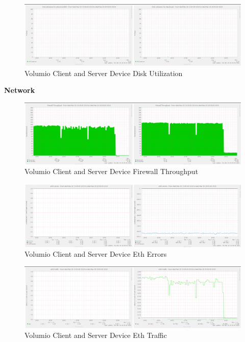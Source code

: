 \documentclass[11pt,a4paper,headinclude=false,footinclude=false]{scrreprt}
\begin{document}
\begin{figure}[H]
\includegraphics{ResultsAndAnalysis/VolumioServerTestImages/009VolumioDiskUtilization.png}
\centering
\caption{Volumio Client and Server Device Disk Utilization}
\label{VolumioDiskUtil}
\end{figure}

\textbf{Network}

\begin{figure}[H]
\includegraphics{ResultsAndAnalysis/VolumioServerTestImages/012VolumioFirewallThroughput.png}
\centering
\caption{Volumio Client and Server Device Firewall Throughput}
\label{VolumioFirewallThroughput}
\end{figure}

\begin{figure}[H]
\includegraphics{ResultsAndAnalysis/VolumioServerTestImages/010VolumioEth0Errors.png}
\centering
\caption{Volumio Client and Server Device Eth Errors}
\label{VolumioEthError}
\end{figure}

\begin{figure}[H]
\includegraphics{ResultsAndAnalysis/VolumioServerTestImages/011VolumioEth0Traffic.png}
\centering
\caption{Volumio Client and Server Device Eth Traffic}
\label{VolumioEthTraffic}
\end{figure}
\end{document}
